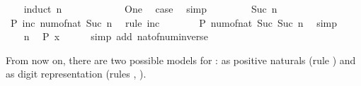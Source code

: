 \begin{isabellebody}
\ \ \isamarkupfalse%
\ {\isacharparenleft}{\kern0pt}induct\ n{\isacharparenright}{\kern0pt}\isanewline
\ \ \ \ \isamarkupfalse%
\ {}\isanewline
\ \ \ \ \isamarkupfalse%
\ One\ \isamarkupfalse%
\ {\isacharquery}{\kern0pt}case\ \isamarkupfalse%
\ simp\isanewline
\ \ \isamarkupfalse%
\isanewline
\ \ \ \ \isamarkupfalse%
\ {\isacharparenleft}{\kern0pt}Suc\ n{\isacharparenright}{\kern0pt}\isanewline
\ \ \ \ \isamarkupfalse%
\ \isamarkupfalse%
\ {\isachardoublequoteopen}P\ {\isacharparenleft}{\kern0pt}inc\ {\isacharparenleft}{\kern0pt}num{\isacharunderscore}{\kern0pt}of{\isacharunderscore}{\kern0pt}nat\ {\isacharparenleft}{\kern0pt}Suc\ n{\isacharparenright}{\kern0pt}{\isacharparenright}{\kern0pt}{\isacharparenright}{\kern0pt}{\isachardoublequoteclose}\ \isamarkupfalse%
\ {\isacharparenleft}{\kern0pt}rule\ inc{\isacharparenright}{\kern0pt}\isanewline
\ \ \ \ \isamarkupfalse%
\ \isamarkupfalse%
\ {\isachardoublequoteopen}P\ {\isacharparenleft}{\kern0pt}num{\isacharunderscore}{\kern0pt}of{\isacharunderscore}{\kern0pt}nat\ {\isacharparenleft}{\kern0pt}Suc\ {\isacharparenleft}{\kern0pt}Suc\ n{\isacharparenright}{\kern0pt}{\isacharparenright}{\kern0pt}{\isacharparenright}{\kern0pt}{\isachardoublequoteclose}\ \isamarkupfalse%
\ simp\isanewline
\ \ \isamarkupfalse%
\isanewline
\ \ \isamarkupfalse%
\ n\ \isamarkupfalse%
\ {\isachardoublequoteopen}P\ x{\isachardoublequoteclose}\isanewline
\ \ \ \ \isamarkupfalse%
\ {\isacharparenleft}{\kern0pt}simp\ add{\isacharcolon}{\kern0pt}\ nat{\isacharunderscore}{\kern0pt}of{\isacharunderscore}{\kern0pt}num{\isacharunderscore}{\kern0pt}inverse{\isacharparenright}{\kern0pt}\isanewline
{}\isamarkupfalse%
%
\endisatagproof
{\isafoldproof}%
%
\isadelimproof
%
\endisadelimproof
%
\begin{isamarkuptext}%
From now on, there are two possible models for : as positive
  naturals (rule ) and as digit representation (rules
  , ).%
\end{isamarkuptext}\isamarkuptrue%
%
\isadelimdocument
%
\endisadelimdocument
%
\isatagdocument
%
\isamarkuptrue%
%
\endisatagdocument
{\isafolddocument}%
%
\isadelimdocument

\end{isabellebody}
